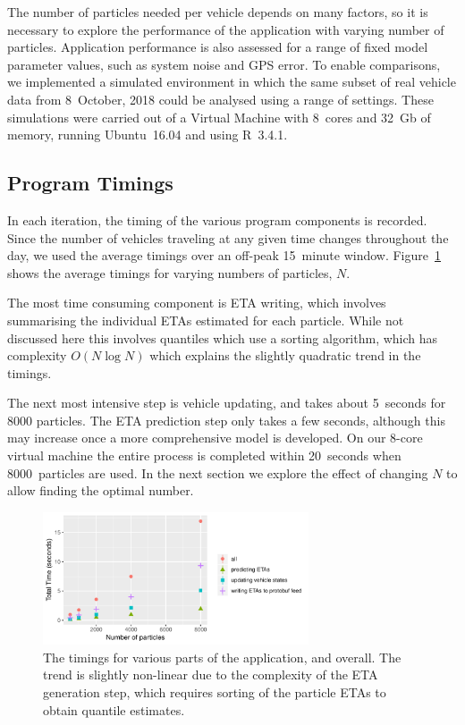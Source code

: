 The number of particles needed per vehicle 
depends on many factors,
so it is necessary to explore the performance of the application
with varying number of particles.
Application performance is also assessed
for a range of fixed model parameter values,
such as system noise and GPS error.
To enable comparisons, we implemented a simulated \rt environment
in which the same subset of real vehicle data from 8~October, 2018
could be analysed using a range of settings.
These simulations were carried out of a Virtual Machine 
with 8~cores and 32~Gb of memory, 
running Ubuntu~16.04 and using R~3.4.1.


\subsection{Program Timings}
\label{sec:timings}

In each iteration, 
the timing of the various program components is recorded.
Since the number of vehicles traveling at any given time changes throughout the day,
we used the average timings over an off-peak 15~minute window.
Figure~\ref{fig:timings} shows the average timings for 
varying numbers of particles, $N$.


The most time consuming component is ETA writing,
which involves summarising the individual ETAs estimated for each particle.
While not discussed here this involves quantiles which use a sorting algorithm,
which has complexity $O(N \log N)$ 
which explains the slightly quadratic trend in the timings.


The next most intensive step is vehicle updating,
and takes about 5~seconds for 8000 particles.
The ETA prediction step only takes a few seconds,
although this may increase once a more comprehensive model is developed.
On our 8-core virtual machine the entire process is completed within 20~seconds
when 8000~particles are used.
In the next section we explore the effect of changing $N$
to allow finding the optimal number.


\begin{figure}[tb]
    \centering
    \includegraphics[width=0.7\textwidth]{figures/04_model_results_timing.pdf}
    \caption{The timings for various parts of the application, and overall. %
        The trend is slightly non-linear due to the complexity of the ETA generation step, %
        which requires sorting of the particle ETAs to obtain quantile estimates.}
    \label{fig:timings}
\end{figure}




